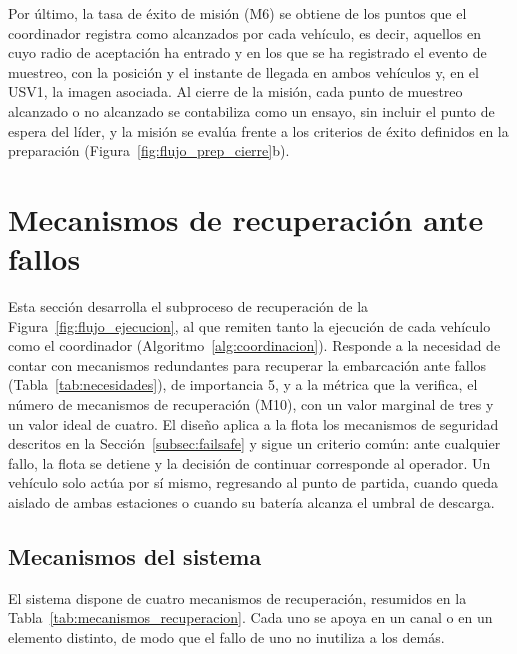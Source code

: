 Por último, la tasa de éxito de misión (M6) se obtiene de los puntos que el coordinador registra como alcanzados 
por cada vehículo, es decir, aquellos en cuyo radio de aceptación ha entrado y en los que se ha registrado el 
evento de muestreo, con la posición y el instante de llegada en ambos vehículos y, en el USV1, la imagen 
asociada. Al cierre de la misión, cada punto de muestreo alcanzado o no alcanzado se contabiliza como un ensayo,  
sin incluir el punto de espera del líder, y la misión se evalúa frente a los criterios de éxito definidos en la 
preparación (Figura~\ref{fig:flujo_prep_cierre}b).

\section{Mecanismos de recuperación ante fallos}
\label{sec:recuperacion}

Esta sección desarrolla el subproceso de recuperación de la Figura~\ref{fig:flujo_ejecucion}, al que remiten tanto la ejecución de cada vehículo como el coordinador (Algoritmo~\ref{alg:coordinacion}). %
Responde a la necesidad de contar con mecanismos redundantes para recuperar la embarcación ante fallos (Tabla~\ref{tab:necesidades}), de importancia 5, y a la métrica que la verifica, el número de mecanismos de recuperación (M10), con un valor marginal de tres y un valor ideal de cuatro. El diseño aplica a la flota los mecanismos de seguridad descritos en la Sección~\ref{subsec:failsafe} y sigue un criterio común: ante cualquier fallo, la flota se detiene y la decisión de continuar corresponde al operador. Un vehículo solo actúa por sí mismo, regresando al punto de partida, cuando queda aislado de ambas estaciones o cuando su batería alcanza el umbral de descarga.

\subsection{Mecanismos del sistema}
\label{subsec:mecanismos_sistema}

El sistema dispone de cuatro mecanismos de recuperación, resumidos en la Tabla~\ref{tab:mecanismos_recuperacion}. Cada uno se apoya en un canal o en un elemento distinto, de modo que el fallo de uno no inutiliza a los demás.

